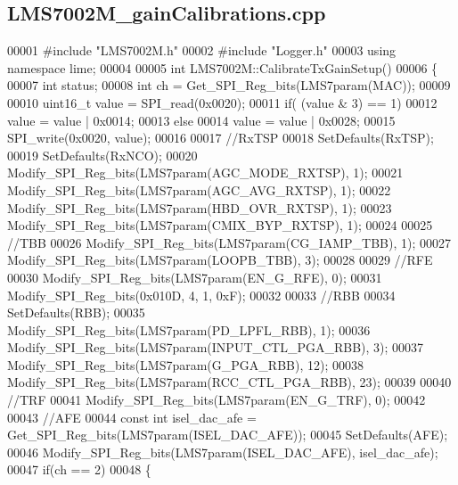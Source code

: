 \subsection{L\+M\+S7002\+M\+\_\+gain\+Calibrations.\+cpp}
\label{LMS7002M__gainCalibrations_8cpp_source}

\begin{DoxyCode}
00001 \textcolor{preprocessor}{#include "LMS7002M.h"}
00002 \textcolor{preprocessor}{#include "Logger.h"}
00003 \textcolor{keyword}{using namespace }lime;
00004 
00005 \textcolor{keywordtype}{int} LMS7002M::CalibrateTxGainSetup()
00006 \{
00007     \textcolor{keywordtype}{int} status;
00008     \textcolor{keywordtype}{int} ch = Get_SPI_Reg_bits(LMS7param(MAC));
00009 
00010     uint16\_t value = SPI_read(0x0020);
00011     \textcolor{keywordflow}{if}( (value & 3) == 1)
00012         value = value | 0x0014;
00013     \textcolor{keywordflow}{else}
00014         value = value | 0x0028;
00015     SPI_write(0x0020, value);
00016 
00017     \textcolor{comment}{//RxTSP}
00018     SetDefaults(RxTSP);
00019     SetDefaults(RxNCO);
00020     Modify_SPI_Reg_bits(LMS7param(AGC_MODE_RXTSP), 1);
00021     Modify_SPI_Reg_bits(LMS7param(AGC_AVG_RXTSP), 1);
00022     Modify_SPI_Reg_bits(LMS7param(HBD_OVR_RXTSP), 1);
00023     Modify_SPI_Reg_bits(LMS7param(CMIX_BYP_RXTSP), 1);
00024 
00025     \textcolor{comment}{//TBB}
00026     Modify_SPI_Reg_bits(LMS7param(CG_IAMP_TBB), 1);
00027     Modify_SPI_Reg_bits(LMS7param(LOOPB_TBB), 3);
00028 
00029     \textcolor{comment}{//RFE}
00030     Modify_SPI_Reg_bits(LMS7param(EN_G_RFE), 0);
00031     Modify_SPI_Reg_bits(0x010D, 4, 1, 0xF);
00032 
00033     \textcolor{comment}{//RBB}
00034     SetDefaults(RBB);
00035     Modify_SPI_Reg_bits(LMS7param(PD_LPFL_RBB), 1);
00036     Modify_SPI_Reg_bits(LMS7param(INPUT_CTL_PGA_RBB), 3);
00037     Modify_SPI_Reg_bits(LMS7param(G_PGA_RBB), 12);
00038     Modify_SPI_Reg_bits(LMS7param(RCC_CTL_PGA_RBB), 23);
00039 
00040     \textcolor{comment}{//TRF}
00041     Modify_SPI_Reg_bits(LMS7param(EN_G_TRF), 0);
00042 
00043     \textcolor{comment}{//AFE}
00044     \textcolor{keyword}{const} \textcolor{keywordtype}{int} isel\_dac\_afe = Get_SPI_Reg_bits(LMS7param(ISEL_DAC_AFE));
00045     SetDefaults(AFE);
00046     Modify_SPI_Reg_bits(LMS7param(ISEL_DAC_AFE), isel\_dac\_afe);
00047     \textcolor{keywordflow}{if}(ch == 2)
00048     \{

\end{DoxyCode}
